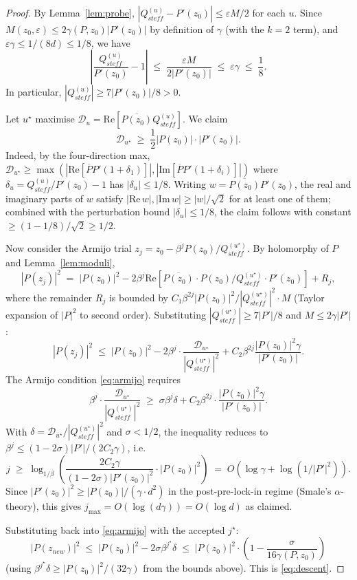 \documentclass[11pt,a4paper]{article}
\begin{document}
\begin{proof}
By Lemma~\ref{lem:probe}, $|Q_{steff}^{(u)} - P'(z_0)| \le \varepsilon M / 2$ for each $u$. Since $M(z_0, \varepsilon) \le 2 \gamma(P, z_0) |P'(z_0)|$ by definition of $\gamma$ (with the $k = 2$ term), and $\varepsilon \gamma \le 1/(8d) \le 1/8$, we have
$$ \left| \frac{Q_{steff}^{(u)}}{P'(z_0)} - 1 \right| \;\le\; \frac{\varepsilon M}{2 |P'(z_0)|} \;\le\; \varepsilon \gamma \;\le\; \frac{1}{8}. $$
In particular, $|Q_{steff}^{(u)}| \ge 7|P'(z_0)|/8 > 0$.

Let $u^\star$ maximise $\mathcal{D}_u = \mathrm{Re}[\overline{P(z_0)} Q_{steff}^{(u)}]$. We claim
$$ \mathcal{D}_{u^\star} \;\ge\; \frac{1}{2} |P(z_0)| \cdot |P'(z_0)|. $$
Indeed, by the four-direction max, $\mathcal{D}_{u^\star} \ge \max(|\mathrm{Re}[\overline{P} P'(1+\delta_1)]|, |\mathrm{Im}[\overline{P} P'(1+\delta_i)]|)$ where $\delta_u = Q_{steff}^{(u)}/P'(z_0) - 1$ has $|\delta_u| \le 1/8$. Writing $w = \overline{P(z_0)} P'(z_0)$, the real and imaginary parts of $w$ satisfy $|\mathrm{Re}\, w|, |\mathrm{Im}\, w| \ge |w|/\sqrt 2$ for at least one of them; combined with the perturbation bound $|\delta_u| \le 1/8$, the claim follows with constant $\ge (1 - 1/8)/\sqrt{2} \ge 1/2$.

Now consider the Armijo trial $z_j = z_0 - \beta^j P(z_0)/Q_{steff}^{(u^\star)}$. By holomorphy of $P$ and Lemma~\ref{lem:moduli},
$$ |P(z_j)|^2 \;=\; |P(z_0)|^2 - 2\beta^j \mathrm{Re}[\overline{P(z_0)} \cdot P(z_0)/Q_{steff}^{(u^\star)} \cdot P'(z_0)] + R_j, $$
where the remainder $R_j$ is bounded by $C_1 \beta^{2j} |P(z_0)|^2 / |Q_{steff}^{(u^\star)}|^2 \cdot M$ (Taylor expansion of $|P|^2$ to second order). Substituting $|Q_{steff}^{(u^\star)}| \ge 7|P'|/8$ and $M \le 2\gamma |P'|$:
$$ |P(z_j)|^2 \;\le\; |P(z_0)|^2 - 2\beta^j \cdot \frac{\mathcal{D}_{u^\star}}{|Q_{steff}^{(u^\star)}|^2} + C_2 \beta^{2j} \frac{|P(z_0)|^2 \gamma}{|P'(z_0)|}. $$
The Armijo condition \eqref{eq:armijo} requires
$$ \beta^j \cdot \frac{\mathcal{D}_{u^\star}}{|Q_{steff}^{(u^\star)}|^2} \;\ge\; \sigma \beta^j \delta + C_2 \beta^{2j} \cdot \frac{|P(z_0)|^2 \gamma}{|P'(z_0)|}. $$
With $\delta = \mathcal{D}_{u^\star}/|Q_{steff}^{(u^\star)}|^2$ and $\sigma < 1/2$, the inequality reduces to $\beta^j \le (1 - 2\sigma) |P'|/(2 C_2 \gamma)$, i.e.
$$ j \;\ge\; \log_{1/\beta}\!\left( \frac{2 C_2 \gamma}{(1 - 2\sigma) |P'(z_0)|^2} \cdot |P(z_0)|^2 \right) \;=\; O(\log \gamma + \log(1/|P'|^2)). $$
Since $|P'(z_0)|^2 \ge |P(z_0)|/(\gamma \cdot d^2)$ in the post-pre-lock-in regime (Smale's $\alpha$-theory), this gives $j_{\max} = O(\log(d \gamma)) = O(\log d)$ as claimed.

Substituting back into \eqref{eq:armijo} with the accepted $j^\star$:
$$ |P(z_{new})|^2 \;\le\; |P(z_0)|^2 - 2 \sigma \beta^{j^\star} \delta \;\le\; |P(z_0)|^2 \cdot \left(1 - \frac{\sigma}{16 \gamma(P, z_0)}\right) $$
(using $\beta^{j^\star} \delta \ge |P(z_0)|^2/(32\gamma)$ from the bounds above). This is \eqref{eq:descent}.
\end{proof}
\end{document}
